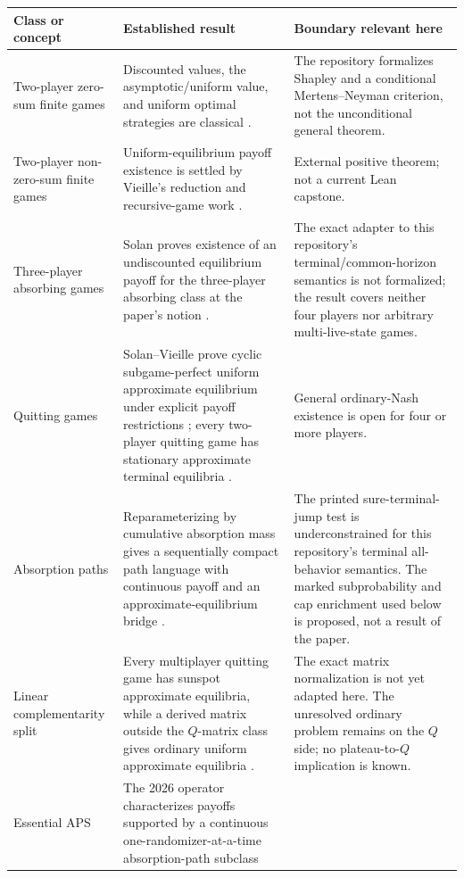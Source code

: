 \documentclass[11pt]{article}
\begin{document}
\begin{longtable}{@{}p{}p{}p{}@{}}
\toprule
Class or concept & Established result & Boundary relevant here\\
\midrule
\endhead
Two-player zero-sum finite games &
Discounted values, the asymptotic/uniform value, and uniform optimal
strategies are classical \cite{Shapley1953,BewleyKohlberg1976,MertensNeyman1981}. &
The repository formalizes Shapley and a conditional Mertens--Neyman
criterion, not the unconditional general theorem.\\
Two-player non-zero-sum finite games &
Uniform-equilibrium payoff existence is settled by Vieille's reduction and
recursive-game work \cite{Vieille2000I,Vieille2000II,Vieille2000III}. &
External positive theorem; not a current Lean capstone.\\
Three-player absorbing games &
Solan proves existence of an undiscounted equilibrium payoff for the
three-player absorbing class at the paper's notion \cite{Solan1999}. &
The exact adapter to this repository's terminal/common-horizon semantics is
not formalized; the result covers neither four players nor arbitrary
multi-live-state games.\\
Quitting games &
Solan--Vieille prove cyclic subgame-perfect uniform approximate equilibrium
under explicit payoff restrictions \cite{SolanVieille2001}; every two-player
quitting game has stationary approximate terminal equilibria
\cite{SolanVieilleExample2002}. &
General ordinary-Nash existence is open for four or more players.\\
Absorption paths &
Reparameterizing by cumulative absorption mass gives a sequentially compact
path language with continuous payoff and an approximate-equilibrium bridge
\cite{AshkenaziGolanEtAl2024}. &
The printed sure-terminal-jump test is underconstrained for this repository's
terminal all-behavior semantics.  The marked subprobability and cap enrichment
used below is proposed, not a result of the paper.\\
Linear complementarity split &
Every multiplayer quitting game has sunspot approximate equilibria, while a
derived matrix outside the $Q$-matrix class gives ordinary uniform
approximate equilibria \cite{SolanSolan2020}. &
The exact matrix normalization is not yet adapted here.  The unresolved
ordinary problem remains on the $Q$ side; no plateau-to-$Q$ implication is
known.\\
Essential APS &
The 2026 operator characterizes payoffs supported by a continuous
one-randomizer-at-a-time absorption-path subclass

\end{longtable}
\end{document}

